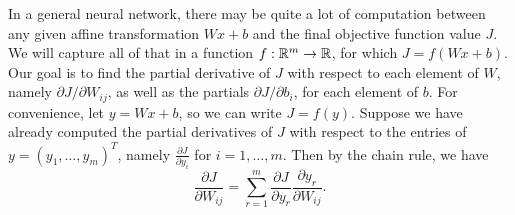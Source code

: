 \documentclass{article}
\theoremstyle{plain}
\theoremstyle{definition}
\begin{document}
In a general neural network, there may be quite a lot of computation
between any given affine transformation $Wx+b$ and the final objective
function value $J$. We will capture all of that in a function $f:\mathbb{R}^{m}\to\mathbb{R}$,
for which $J=f(Wx+b)$. Our goal is to find the partial derivative
of $J$ with respect to each element of $W$, namely $\partial J/\partial W_{ij}$,
as well as the partials $\partial J/\partial b_{i}$, for each element
of $b$. For convenience, let $y=Wx+b$, so we can write $J=f(y)$.
Suppose we have already computed the partial derivatives of $J$ with
respect to the entries of $y=\left(y_{1},\ldots,y_{m}\right)^{T}$,
namely $\frac{\partial J}{\partial y_{i}}$ for $i=1,\ldots,m$. Then
by the chain rule, we have
\[
\frac{\partial J}{\partial W_{ij}}=\sum_{r=1}^{m}\frac{\partial J}{\partial y_{r}}\frac{\partial y_{r}}{\partial W_{ij}}.
\]
\end{document}
